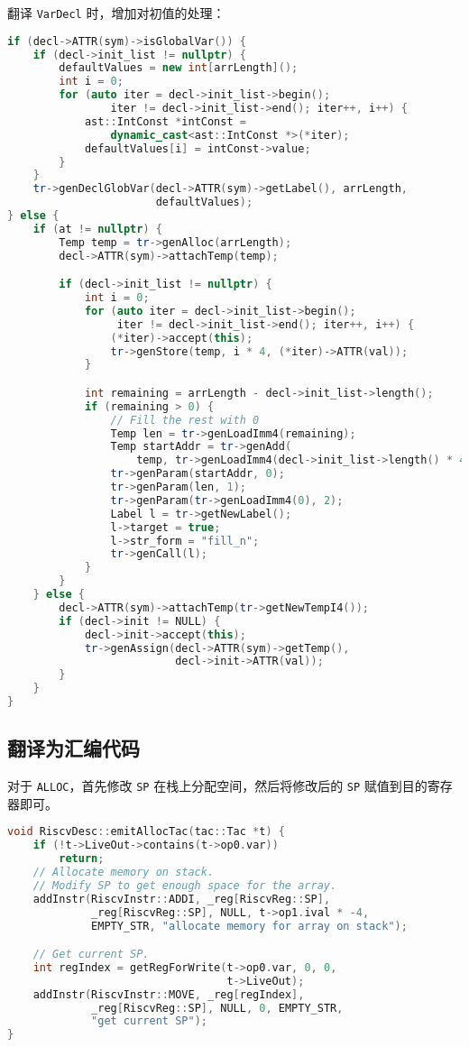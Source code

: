 \documentclass[a4paper]{article}
\begin{document}
翻译 \texttt{VarDecl} 时，增加对初值的处理：

\begin{lstlisting}[language=c++]
if (decl->ATTR(sym)->isGlobalVar()) {
    if (decl->init_list != nullptr) {
        defaultValues = new int[arrLength]();
        int i = 0;
        for (auto iter = decl->init_list->begin();
                iter != decl->init_list->end(); iter++, i++) {
            ast::IntConst *intConst =
                dynamic_cast<ast::IntConst *>(*iter);
            defaultValues[i] = intConst->value;
        }
    }
    tr->genDeclGlobVar(decl->ATTR(sym)->getLabel(), arrLength,
                       defaultValues);
} else {
    if (at != nullptr) {
        Temp temp = tr->genAlloc(arrLength);
        decl->ATTR(sym)->attachTemp(temp);

        if (decl->init_list != nullptr) {
            int i = 0;
            for (auto iter = decl->init_list->begin();
                 iter != decl->init_list->end(); iter++, i++) {
                (*iter)->accept(this);
                tr->genStore(temp, i * 4, (*iter)->ATTR(val));
            }

            int remaining = arrLength - decl->init_list->length();
            if (remaining > 0) {
                // Fill the rest with 0
                Temp len = tr->genLoadImm4(remaining);
                Temp startAddr = tr->genAdd(
                    temp, tr->genLoadImm4(decl->init_list->length() * 4));
                tr->genParam(startAddr, 0);
                tr->genParam(len, 1);
                tr->genParam(tr->genLoadImm4(0), 2);
                Label l = tr->getNewLabel();
                l->target = true;
                l->str_form = "fill_n";
                tr->genCall(l);
            }
        }
    } else {
        decl->ATTR(sym)->attachTemp(tr->getNewTempI4());
        if (decl->init != NULL) {
            decl->init->accept(this);
            tr->genAssign(decl->ATTR(sym)->getTemp(),
                          decl->init->ATTR(val));
        }
    }
}
\end{lstlisting}

\subsection{翻译为汇编代码}

对于 \texttt{ALLOC}，首先修改 \texttt{SP} 在栈上分配空间，然后将修改后的 \texttt{SP} 赋值到目的寄存器即可。

\begin{lstlisting}[language=c++]
void RiscvDesc::emitAllocTac(tac::Tac *t) {
    if (!t->LiveOut->contains(t->op0.var))
        return;
    // Allocate memory on stack.
    // Modify SP to get enough space for the array.
    addInstr(RiscvInstr::ADDI, _reg[RiscvReg::SP],
             _reg[RiscvReg::SP], NULL, t->op1.ival * -4,
             EMPTY_STR, "allocate memory for array on stack");

    // Get current SP.
    int regIndex = getRegForWrite(t->op0.var, 0, 0,
                                  t->LiveOut);
    addInstr(RiscvInstr::MOVE, _reg[regIndex],
             _reg[RiscvReg::SP], NULL, 0, EMPTY_STR,
             "get current SP");
}
\end{lstlisting}
\end{document}
